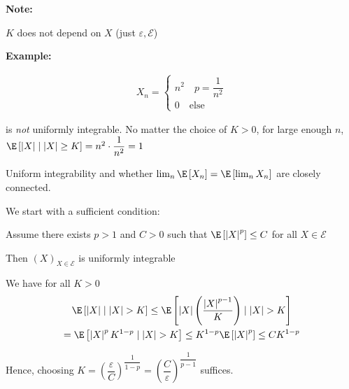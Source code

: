 \par\bigskip
\noindent\textbf{Note:}\par
\noindent $K$ does not depend on $X$ (just $\varepsilon,\mathcal{E}$)
\par\bigskip
\noindent\textbf{Example:}\par
\begin{equation*}
  \begin{gathered}
    X_n = \begin{cases}
      n^2\quad p=\dfrac{1}{n^2}\\0\quad\text{else}
    \end{cases}
  \end{gathered}
\end{equation*}\par
\noindent is \textit{not} uniformly integrable. No matter the choice of $K>0$, for large enough $n$, $\E\left[\left|X\right|\mid \left|X\right|\geq K\right] = n^2\cdot\dfrac{1}{n^2} = 1$
\par\bigskip
\noindent Uniform integrability and whether $\lim_{n}\E\left[X_n\right]=\E\left[\lim_{n}X_n\right]$ are closely connected.
\par\bigskip
\noindent We start with a sufficient condition:
\par\bigskip
\begin{lem}[]{}
  Assume there exists $p>1$ and $C>0$ such that $\E\left[\left|X\right|^p\right]\leq C$ for all $X\in\mathcal{E}$\par
  \noindent Then $(X)_{X\in\mathcal{E}}$ is uniformly integrable
\end{lem}
\par\bigskip
\begin{prf}[]{}
  We have for all $K>0$
  \begin{equation*}
    \begin{gathered}
      \E\left[\left|X\right|\mid\left|X\right|>K\right]\leq\E\left[\left|X\right|\left(\dfrac{\left|X\right|^{p-1}}{K}\right)\mid\left|X\right|>K\right]\\
      =\E\left[\left|X\right|^pK^{1-p}\mid\left|X\right|>K\right]\leq K^{1-p}\E\left[\left|X\right|^p\right]\leq CK^{1-p}
    \end{gathered}
  \end{equation*}
  \par\bigskip
  \noindent Hence, choosing $K =\left(\dfrac{\varepsilon}{C}\right)^{\dfrac{1}{1-p}} = \left(\dfrac{C}{\varepsilon}\right)^{\dfrac{1}{p-1}}$ suffices.
\end{prf}
\par\bigskip
